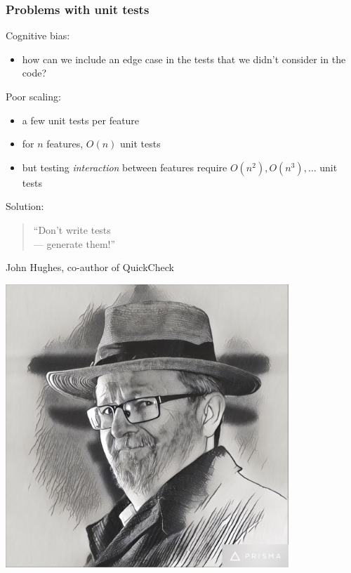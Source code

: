 \documentclass{beamer}
\begin{document}
\begin{frame}[fragile]
  \frametitle{Problems with unit tests}

  Cognitive bias:
  \begin{itemize}
  \item how can we include an edge case in the tests
    that we didn't consider in the code?
  \end{itemize}
  \medskip
  
  Poor scaling:
  \begin{itemize}
  \item a few unit tests per feature
  \item for $n$ features, $O(n)$ unit tests
  \item but testing \emph{interaction} between features require $O(n^2),
    O(n^3), \ldots$ unit tests
  \end{itemize}
  \pause
  \bigskip
  
  Solution:

    \begin{minipage}{0.6\textwidth}
      \begin{quote}
        ``Don't write tests \\
        --- generate them!''
      \end{quote}
      John Hughes, co-author of QuickCheck
    \end{minipage}
    \begin{minipage}{0.3\textwidth}
      \hfill
      \includegraphics[width=0.8\textwidth]{images/john-hughes}
    \end{minipage}
  
\end{frame}
\end{document}
